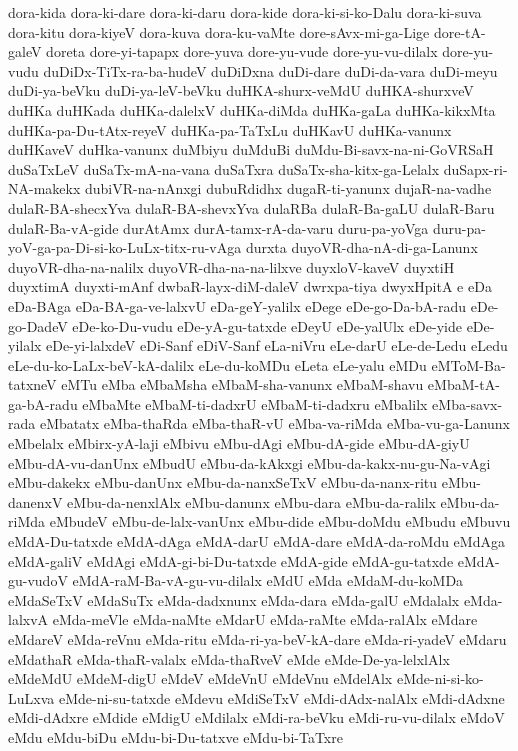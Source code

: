 {dora-kida
dora-ki-dare
dora-ki-daru
dora-kide
dora-ki-si-ko-Dalu
dora-ki-suva
dora-kitu
dora-kiyeV
dora-kuva
dora-ku-vaMte
dore-sAvx-mi-ga-Lige
dore-tA-galeV
doreta
dore-yi-tapapx
dore-yuva
dore-yu-vude
dore-yu-vu-dilalx
dore-yu-vudu
duDiDx-TiTx-ra-ba-hudeV
duDiDxna
duDi-dare
duDi-da-vara
duDi-meyu
duDi-ya-beVku
duDi-ya-leV-beVku
duHKA-shurx-veMdU
duHKA-shurxveV
duHKa
duHKada
duHKa-dalelxV
duHKa-diMda
duHKa-gaLa
duHKa-kikxMta
duHKa-pa-Du-tAtx-reyeV
duHKa-pa-TaTxLu
duHKavU
duHKa-vanunx
duHKaveV
duHka-vanunx
duMbiyu
duMduBi
duMdu-Bi-savx-na-ni-GoVRSaH
duSaTxLeV
duSaTx-mA-na-vana
duSaTxra
duSaTx-sha-kitx-ga-Lelalx
duSapx-ri-NA-makekx
dubiVR-na-nAnxgi
dubuRdidhx
dugaR-ti-yanunx
dujaR-na-vadhe
dulaR-BA-shecxYva
dulaR-BA-shevxYva
dulaRBa
dulaR-Ba-gaLU
dulaR-Baru
dulaR-Ba-vA-gide
durAtAmx
durA-tamx-rA-da-varu
duru-pa-yoVga
duru-pa-yoV-ga-pa-Di-si-ko-LuLx-titx-ru-vAga
durxta
duyoVR-dha-nA-di-ga-Lanunx
duyoVR-dha-na-nalilx
duyoVR-dha-na-na-lilxve
duyxloV-kaveV
duyxtiH
duyxtimA
duyxti-mAnf
dwbaR-layx-diM-daleV
dwrxpa-tiya
dwyxHpitA
e
eDa
eDa-BAga
eDa-BA-ga-ve-lalxvU
eDa-geY-yalilx
eDege
eDe-go-Da-bA-radu
eDe-go-DadeV
eDe-ko-Du-vudu
eDe-yA-gu-tatxde
eDeyU
eDe-yalUlx
eDe-yide
eDe-yilalx
eDe-yi-lalxdeV
eDi-Sanf
eDiV-Sanf
eLa-niVru
eLe-darU
eLe-de-Ledu
eLedu
eLe-du-ko-LaLx-beV-kA-dalilx
eLe-du-koMDu
eLeta
eLe-yalu
eMDu
eMToM-Ba-tatxneV
eMTu
eMba
eMbaMsha
eMbaM-sha-vanunx
eMbaM-shavu
eMbaM-tA-ga-bA-radu
eMbaMte
eMbaM-ti-dadxrU
eMbaM-ti-dadxru
eMbalilx
eMba-savx-rada
eMbatatx
eMba-thaRda
eMba-thaR-vU‌
eMba-va-riMda
eMba-vu-ga-Lanunx
eMbelalx
eMbirx-yA-laji
eMbivu
eMbu-dAgi
eMbu-dA-gide
eMbu-dA-giyU
eMbu-dA-vu-danUnx
eMbudU
eMbu-da-kAkxgi
eMbu-da-kakx-nu-gu-Na-vAgi
eMbu-dakekx
eMbu-danUnx
eMbu-da-nanxSeTxV
eMbu-da-nanx-ritu
eMbu-danenxV
eMbu-da-nenxlAlx
eMbu-danunx
eMbu-dara
eMbu-da-ralilx
eMbu-da-riMda
eMbudeV
eMbu-de-lalx-vanUnx
eMbu-dide
eMbu-doMdu
eMbudu
eMbuvu
eMdA-Du-tatxde
eMdA-dAga
eMdA-darU
eMdA-dare
eMdA-da-roMdu
eMdAga
eMdA-galiV
eMdAgi
eMdA-gi-bi-Du-tatxde
eMdA-gide
eMdA-gu-tatxde
eMdA-gu-vudoV
eMdA-raM-Ba-vA-gu-vu-dilalx
eMdU
eMda
eMdaM-du-koMDa
eMdaSeTxV
eMdaSuTx
eMda-dadxnunx
eMda-dara
eMda-galU
eMdalalx
eMda-lalxvA
eMda-meVle
eMda-naMte
eMdarU
eMda-raMte
eMda-ralAlx
eMdare
eMdareV
eMda-reVnu
eMda-ritu
eMda-ri-ya-beV-kA-dare
eMda-ri-yadeV
eMdaru
eMdathaR
eMda-thaR-valalx
eMda-thaRveV
eMde
eMde-De-ya-lelxlAlx
eMdeMdU
eMdeM-digU
eMdeV
eMdeVnU
eMdeVnu
eMdelAlx
eMde-ni-si-ko-LuLxva
eMde-ni-su-tatxde
eMdevu
eMdiSeTxV
eMdi-dAdx-nalAlx
eMdi-dAdxne
eMdi-dAdxre
eMdide
eMdigU
eMdilalx
eMdi-ra-beVku
eMdi-ru-vu-dilalx
eMdoV
eMdu
eMdu-biDu
eMdu-bi-Du-tatxve
eMdu-bi-TaTxre
}
